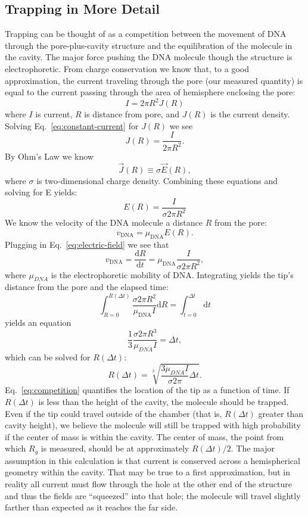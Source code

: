 \documentclass[aps,prl,preprint,groupedaddress]{revtex4}
\begin{document}
\subsection{Trapping in More Detail}

Trapping can be thought of as a competition between the movement of DNA through the pore-plus-cavity structure and the equilibration of the molecule in the cavity.
The major force pushing the DNA molecule though the structure is electrophoretic.
From charge conservation we know that, to a good approximation, the current traveling through the pore (our measured quantity) is equal to the current passing through the area of hemisphere enclosing the pore: 
\begin{equation} I = 2 \pi R^2 J(R) \label{eq:constant-current}\end{equation} 
where \(I\) is current, \(R\) is distance from pore, and \(J(R)\) is the current density.
Solving Eq.~\ref{eq:constant-current} for \(J(R)\) we see 
\[J(R) = \frac{I}{2 \pi R^2}.\] 
By Ohm's Law we know 
\[\overrightarrow{J}(R) \equiv \sigma \overrightarrow{E}(R),\]
where \(\sigma\) is two-dimensional charge density.
Combining these equations and solving for E yields:
\begin{equation} E(R) = \frac{I}{\sigma 2 \pi R^2} \label{eq:electric-field} \end{equation} 
We know the velocity of the DNA molecule a distance \(R\) from the pore: 
\begin{equation} v_{\mathrm{DNA}} = \mu_{\mathrm{DNA}} E(R) \label{eq:velocity} .\end{equation} 
Plugging in Eq.~\ref{eq:electric-field} we see that
\[v_{\mathrm{DNA}} = \frac{\mathrm{d}R}{\mathrm{d}t} = \mu_{\mathrm{DNA}} \frac{I}{\sigma 2 \pi R^2},\]
where \(\mu_{DNA}\) is the electrophoretic mobility of DNA.
Integrating yields the tip's distance from the pore and the elapsed time:
\[\int_{R=0}^{R(\Delta t)} \frac{\sigma 2 \pi R^2}{\mu_{\mathrm{DNA}} I} \mathrm{d}R = \int_{t=0}^{\Delta t} \mathrm{d}t \]
yields an equation
\[\frac{1}{3} \frac{\sigma 2 \pi R^3}{\mu_{DNA} I} = \Delta t,\]
which can be solved for \(R(\Delta t)\):
\begin{equation} R(\Delta t) = \sqrt[3]{\frac{3 \mu_{DNA} I}{\sigma 2 \pi}\Delta t} .\label{eq:competition}\end{equation}
Eq.~\ref{eq:competition} quantifies the location of the tip as a function of time.
If \(R(\Delta t)\) is less than the height of the cavity, the molecule should be trapped.
Even if the tip could travel outside of the chamber (that is, \(R(\Delta t)\) greater than cavity height), we believe the molecule will still be trapped with high probability if the center of mass is within the cavity.
The center of mass, the point from which \(R_g\) is measured, should be at approximately \(R(\Delta t)/2\).
The major assumption in this calculation is that current is conserved across a hemispherical geometry within the cavity.
That may be true to a first approximation, but in reality all current must flow through the hole at the other end of the structure and thus the fields are ``squeezed'' into that hole; the molecule will travel slightly farther than expected as it reaches the far side.
\end{document}
